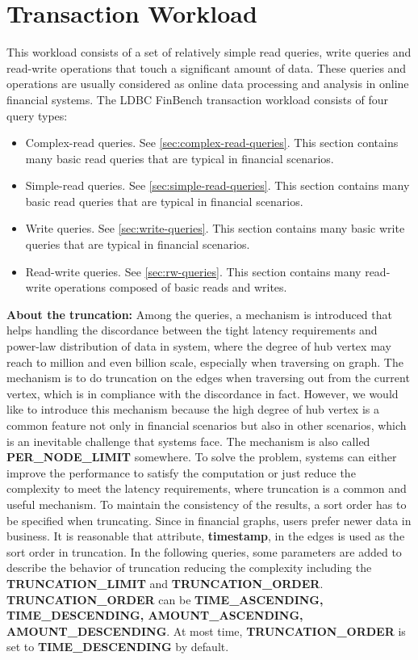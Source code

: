 \chapter{Transaction Workload}
\label{sec:transaction-workload}

This workload consists of a set of relatively simple read queries, write queries
and read-write operations that touch a significant amount of data. These
queries and operations are usually considered as online data processing and
analysis in online financial systems. The LDBC FinBench transaction workload
consists of four query types:
\begin{itemize}
    \item Complex-read queries. See \autoref{sec:complex-read-queries}. This
          section contains many basic read queries that are typical in financial
          scenarios.
    \item Simple-read queries. See \autoref{sec:simple-read-queries}. This
          section contains many basic read queries that are typical in financial
          scenarios.
    \item Write queries. See \autoref{sec:write-queries}. This section contains
          many basic write queries that are typical in financial scenarios.
    \item Read-write queries. See \autoref{sec:rw-queries}. This section
          contains many read-write operations composed of basic reads and writes.
\end{itemize}

{\flushleft \textbf{About the truncation:}} Among the queries, a mechanism is
introduced that helps handling the discordance between the tight latency requirements
and power-law distribution of data in system, where the degree of hub vertex may
reach to million and even billion scale, especially when traversing on graph.
The mechanism is to do truncation on the edges when traversing out from the
current vertex, which is in compliance with the discordance in fact. However, we
would like to introduce this mechanism because the high degree of hub vertex is
a common feature not only in financial scenarios but also in other scenarios,
which is an inevitable challenge that systems face. The mechanism is also called
\textbf{PER\_NODE\_LIMIT} somewhere. To solve the problem, systems can either
improve the performance to satisfy the computation or just reduce the
complexity to meet the latency requirements, where truncation is a common and
useful mechanism. To maintain the consistency of the results, a sort order has
to be specified when truncating. Since in financial graphs, users prefer newer
data in business. It is reasonable that attribute, \textbf{timestamp}, in the
edges is used as the sort order in truncation. In the following queries, some
parameters are added to describe the behavior of truncation reducing the
complexity including the \textbf{TRUNCATION\_LIMIT} and \textbf{TRUNCATION\_ORDER}.
\textbf{TRUNCATION\_ORDER} can be \textbf{TIME\_ASCENDING, TIME\_DESCENDING,
AMOUNT\_ASCENDING, AMOUNT\_DESCENDING}. At most time, \textbf{TRUNCATION\_ORDER}
is set to \textbf{TIME\_DESCENDING} by default.

